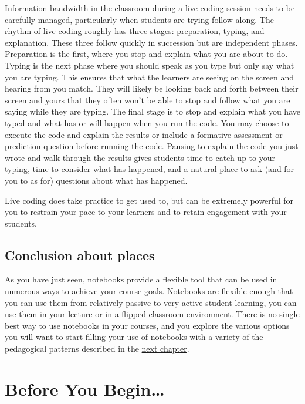 \documentclass[]{book}
\begin{document}
Information bandwidth in the classroom during a live coding session needs to be
carefully managed, particularly when students are trying follow along. The
rhythm of live coding roughly has three stages: preparation, typing, and
explanation. These three follow quickly in succession but are independent
phases. Preparation is the first, where you stop and explain what you are about
to do. Typing is the next phase where you should speak as you type but only say
what you are typing. This ensures that what the learners are seeing on the
screen and hearing from you match. They will likely be looking back and forth
between their screen and yours that they often won't be able to stop and follow
what you are saying while they are typing. The final stage is to stop and
explain what you have typed and what has or will happen when you run the code.
You may choose to execute the code and explain the results or include a
formative assessment or prediction question before running the code. Pausing to
explain the code you just wrote and walk through the results gives students time
to catch up to your typing, time to consider what has happened, and a natural
place to ask (and for you to as for) questions about what has happened.

Live coding does take practice to get used to, but can be extremely powerful for
you to restrain your pace to your learners and to retain engagement with your
students.

\hypertarget{conclusion-about-places}{%
\subsection{Conclusion about places}\label{conclusion-about-places}}

As you have just seen, notebooks provide a flexible tool that can be used in
numerous ways to achieve your course goals. Notebooks are flexible enough that
you can use them from relatively passive to very active student learning, you
can use them in your lecture or in a flipped-classroom environment. There is no
single best way to use notebooks in your courses, and you explore the various
options you will want to start filling your use of notebooks with a variety of
the pedagogical patterns described in the \protect\hyperlink{catalogue}{next chapter}.

\hypertarget{before-you-begin}{%
\section{Before You Begin\ldots{}}\label{before-you-begin}}
\end{document}
